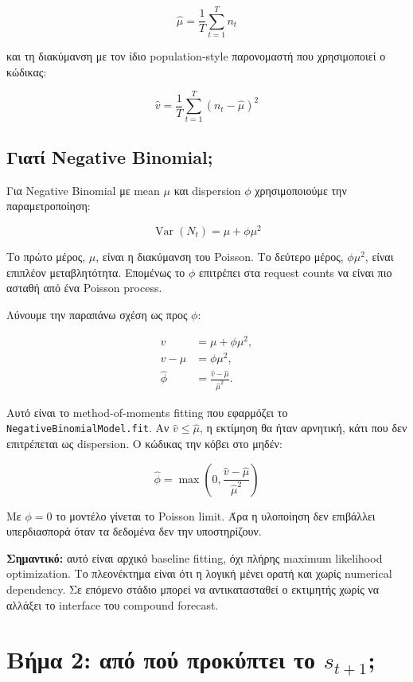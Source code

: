 \documentclass[11pt,a4paper]{article}
\newcommand{\equationnote}[1]{
  \begin{center}
    \colorbox{boxblue}{\parbox{0.92\linewidth}{\begin{equation*}#1\end{equation*}}}
  \end{center}
}
\newcommand{\code}[1]{\texttt{#1}}
\begin{document}
\equationnote{\hat{\mu} = \frac{1}{T}\sum_{t=1}^{T} n_t}

και τη διακύμανση με τον ίδιο population-style παρονομαστή που χρησιμοποιεί
ο κώδικας:

\equationnote{\hat{v} = \frac{1}{T}\sum_{t=1}^{T}(n_t-\hat{\mu})^2}

\subsection{Γιατί Negative Binomial;}

Για Negative Binomial με mean $\mu$ και dispersion $\phi$ χρησιμοποιούμε την
παραμετροποίηση:

\equationnote{\operatorname{Var}(N_t) = \mu + \phi\mu^2}

Το πρώτο μέρος, $\mu$, είναι η διακύμανση του Poisson. Το δεύτερο μέρος,
$\phi\mu^2$, είναι επιπλέον μεταβλητότητα. Επομένως το $\phi$ επιτρέπει στα
request counts να είναι πιο ασταθή από ένα Poisson process.

Λύνουμε την παραπάνω σχέση ως προς $\phi$:

\begin{align*}
  v &= \mu + \phi\mu^2,\\
  v-\mu &= \phi\mu^2,\\
  \hat{\phi} &= \frac{\hat{v}-\hat{\mu}}{\hat{\mu}^2}.
\end{align*}

Αυτό είναι το method-of-moments fitting που εφαρμόζει το
\code{NegativeBinomialModel.fit}. Αν $\hat{v}\leq\hat{\mu}$, η εκτίμηση θα
ήταν αρνητική, κάτι που δεν επιτρέπεται ως dispersion. Ο κώδικας την κόβει
στο μηδέν:

\equationnote{\hat{\phi} = \max\left(0,\frac{\hat{v}-\hat{\mu}}{\hat{\mu}^2}\right)}

Με $\phi=0$ το μοντέλο γίνεται το Poisson limit. Άρα η υλοποίηση δεν
επιβάλλει υπερδιασπορά όταν τα δεδομένα δεν την υποστηρίζουν.

\textbf{Σημαντικό:} αυτό είναι αρχικό baseline fitting, όχι πλήρης maximum
likelihood optimization. Το πλεονέκτημα είναι ότι η λογική μένει ορατή και
χωρίς numerical dependency. Σε επόμενο στάδιο μπορεί να αντικατασταθεί ο
εκτιμητής χωρίς να αλλάξει το interface του compound forecast.

\section{Βήμα 2: από πού προκύπτει το $s_{t+1}$;}
\end{document}
